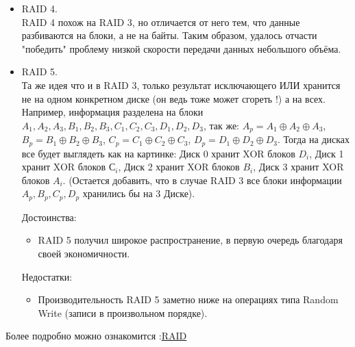 \begin {itemize}
\begin{figure}[h!]
\begin{minipage}[h]{0.3\linewidth}
\end{minipage}
\hfill
\begin{minipage}[h]{0.3\linewidth}
\end{minipage}
\end{figure}


\item RAID 4. \\
RAID 4 похож на RAID 3, но отличается от него тем, что данные разбиваются на блоки, а не на байты. Таким образом, удалось отчасти "победить" проблему низкой скорости передачи данных небольшого объёма.

\item RAID 5. \\
Та же идея что и в RAID 3, только результат исключающего ИЛИ хранится не на одном конкретном диске (он ведь тоже может сгореть !) а на всех. Например, информация разделена на блоки \\ $A_1, A_2, A_3, B_1, B_2, B_3, C_1, C_2, C_3, D_1, D_2, D_3$, так же:
$A_p = A_1 \oplus A_2 \oplus A_3$, 
$B_p = B_1 \oplus B_2 \oplus B_3$, $C_p = C_1 \oplus C_2 \oplus C_3$, $D_p = D_1 \oplus D_2 \oplus D_3$. Тогда на дисках все будет выглядеть как на картинке: Диск 0 хранит XOR блоков $D_i$, Диск 1 хранит XOR блоков $С_i$, Диск 2 хранит XOR блоков $B_i$, Диск 3 хранит XOR блоков $A_i$. (Остается добавить, что в случае RAID 3 все блоки информации $A_p, B_p, C_p, D_p$ хранились бы на 3 Диске).

Достоинства:
\begin {itemize}
\item RAID 5 получил широкое распространение, в первую очередь благодаря своей экономичности. 
\end {itemize}

Недостатки:
\begin {itemize}
\item Производительность RAID 5 заметно ниже на операциях типа Random Write (записи в произвольном порядке).
\end {itemize}
\end {itemize}
Более подробно можно ознакомится :\href{https://ru.wikipedia.org/wiki/RAID}{RAID}

